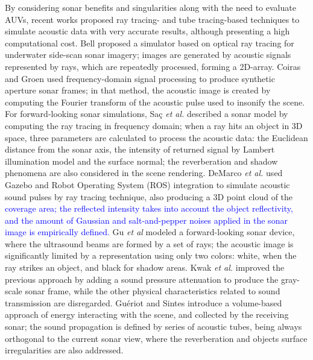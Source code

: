 \documentclass[final,5p,times]{elsarticle}
\begin{document}
By considering sonar benefits and singularities along with the need to evaluate AUVs, recent works proposed ray tracing- \cite{bell1997,coiras2009,sac2015,demarco2015,gu2013,kwak2015}
and tube tracing-based \cite{gueriot2010} techniques to simulate acoustic data
with very accurate results, although presenting a high computational cost.
Bell \cite{bell1997} proposed a simulator based on optical ray tracing for
underwater side-scan sonar imagery; images are generated by acoustic
signals represented by rays, which are repeatedly processed, forming a
2D-array. Coiras and Groen \cite{coiras2009} used frequency-domain
signal processing to produce synthetic aperture sonar frames; in that method,
the acoustic image is created by computing the Fourier transform of the
acoustic pulse used to insonify the scene. For forward-looking sonar
simulations, Saç \textit{et al.}
\cite{sac2015} described a sonar model by computing the ray tracing in
frequency domain; when a ray hits an object in 3D space, three parameters
are calculated to process the acoustic data: the Euclidean distance from
the sonar axis, the intensity of returned signal by Lambert illumination
model and the surface normal; the reverberation and shadow phenomena are
also considered in the scene rendering. DeMarco \textit{et al.}
\cite{demarco2015} used Gazebo and Robot Operating System (ROS)
\cite{quigley2009} integration to simulate acoustic sound pulses by
ray tracing technique, also producing a 3D point cloud of the \textcolor{blue}{coverage area; the reflected intensity takes into account the object reflectivity, and the amount of Gaussian and salt-and-pepper noises applied in the sonar image is empirically defined.} Gu \textit{et al} \cite{gu2013} modeled a forward-looking sonar device, where the ultrasound beams are formed by a set of rays; the acoustic image is significantly limited by a representation using only two colors: white, when the ray strikes an object, and black for shadow areas. Kwak \textit{et al.} \cite{kwak2015} improved the previous approach by adding a sound pressure attenuation to produce the gray-scale sonar frame, while the other physical characteristics related to sound transmission are disregarded. Guériot and Sintes \cite{gueriot2010} introduce a volume-based
approach of energy interacting with the scene, and collected by the receiving
sonar; the sound propagation is defined by series of acoustic tubes, being
always orthogonal to the current sonar view, where the reverberation and
objects surface irregularities are also addressed.
\end{document}

